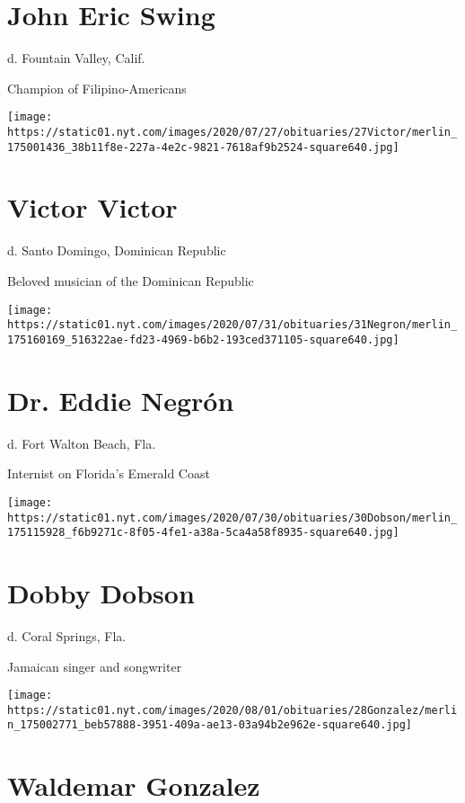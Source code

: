 \hypertarget{john-eric-swing}{%
\section{John Eric Swing}\label{john-eric-swing}}

d. Fountain Valley, Calif.

Champion of Filipino-Americans

\texttt{[image: https://static01.nyt.com/images/2020/07/27/obituaries/27Victor/merlin\_175001436\_38b11f8e-227a-4e2c-9821-7618af9b2524-square640.jpg]}

\hypertarget{victor-victor}{%
\section{Victor Victor}\label{victor-victor}}

d. Santo Domingo, Dominican Republic

Beloved musician of the Dominican Republic

\texttt{[image: https://static01.nyt.com/images/2020/07/31/obituaries/31Negron/merlin\_175160169\_516322ae-fd23-4969-b6b2-193ced371105-square640.jpg]}

\hypertarget{dr-eddie-negruxf3n}{%
\section{Dr. Eddie Negrón}\label{dr-eddie-negruxf3n}}

d. Fort Walton Beach, Fla.

Internist on Florida's Emerald Coast

\texttt{[image: https://static01.nyt.com/images/2020/07/30/obituaries/30Dobson/merlin\_175115928\_f6b9271c-8f05-4fe1-a38a-5ca4a58f8935-square640.jpg]}

\hypertarget{dobby-dobson}{%
\section{Dobby Dobson}\label{dobby-dobson}}

d. Coral Springs, Fla.

Jamaican singer and songwriter

\texttt{[image: https://static01.nyt.com/images/2020/08/01/obituaries/28Gonzalez/merlin\_175002771\_beb57888-3951-409a-ae13-03a94b2e962e-square640.jpg]}

\hypertarget{waldemar-gonzalez}{%
\section{Waldemar Gonzalez}\label{waldemar-gonzalez}}

